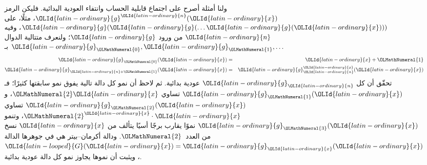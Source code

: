 \documentclass[../../../include/open-logic-section]{subfiles}
\begin{document}
ولنا أمثلة أصرح على اجتماع قابلية الحساب وانتفاء العودية البدائية. فليكن
الرمز ${\OLId{latin-ordinary}{g}}^{\OLId{latin-ordinary}{n}}({\OLId{latin-ordinary}{x}})$، مثلًا، على ${\OLId{latin-ordinary}{g}}({\OLId{latin-ordinary}{g}}(\dots {\OLId{latin-ordinary}{g}}({\OLId{latin-ordinary}{x}})))$، وفيه ${\OLId{latin-ordinary}{n}}$ من ورود
${\OLId{latin-ordinary}{g}}$؛ ولنعرف متتالية الدوال ${\OLId{latin-ordinary}{g}}_{\OLMathNumeral{0}},{\OLId{latin-ordinary}{g}}_{\OLMathNumeral{1}},\dots$ بـ
\begin{eqnarray*}
{\OLId{latin-ordinary}{g}}_{\OLMathNumeral{0}}({\OLId{latin-ordinary}{x}}) & = & {\OLId{latin-ordinary}{x}}+{\OLMathNumeral{1}} \\
{\OLId{latin-ordinary}{g}}_{{\OLId{latin-ordinary}{n}} + {\OLMathNumeral{1}}}({\OLId{latin-ordinary}{x}}) & = & {\OLId{latin-ordinary}{g}}_{\OLId{latin-ordinary}{n}}^{\OLId{latin-ordinary}{x}}({\OLId{latin-ordinary}{x}})
\end{eqnarray*}
تحقّق أن كل ${\OLId{latin-ordinary}{g}}_{\OLId{latin-ordinary}{n}}$ عودية بدائية. ثم لاحظ أن نمو كل دالة تالية
يفوق نمو سابقتها كثيرًا؛ فـ${\OLId{latin-ordinary}{g}}_{\OLMathNumeral{1}}({\OLId{latin-ordinary}{x}})$ تساوي ${\OLMathNumeral{2}}{\OLId{latin-ordinary}{x}}$، و${\OLId{latin-ordinary}{g}}_{\OLMathNumeral{2}}({\OLId{latin-ordinary}{x}})$ تساوي
${\OLMathNumeral{2}}^{\OLId{latin-ordinary}{x}}\cdot {\OLId{latin-ordinary}{x}}$، وتنمو ${\OLId{latin-ordinary}{g}}_{\OLMathNumeral{3}}({\OLId{latin-ordinary}{x}})$ نموًا يقارب برجًا أسيًا يتألف من ${\OLId{latin-ordinary}{x}}$
نسخ من العدد~${\OLMathNumeral{2}}$. ودالة أكرمان--بيتر هي في جوهرها الدالة ${\OLId{latin-looped}{G}}({\OLId{latin-ordinary}{x}})={\OLId{latin-ordinary}{g}}_{\OLId{latin-ordinary}{x}}({\OLId{latin-ordinary}{x}})$،
ويثبت أن نموها يجاوز نمو كل دالة عودية بدائية.
\end{document}
